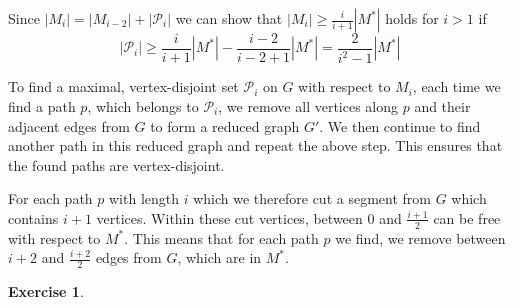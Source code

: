 \documentclass[a4paper,12pt,headsepline]{scrartcl}
\newtheorem{aufgabe}{Exercise}
\begin{document}
Since $|M_i|=|M_{i-2}|+|\mathcal P_i|$ we can show that $|M_i|\ge\frac{i}{i+1}|M^*|$ holds for $i>1$ if
\[ |\mathcal P_i|\ge\frac{i}{i+1}|M^*|-\frac{i-2}{i-2+1}|M^*|=\frac{2}{i^2-1}|M^*| \]

To find a maximal, vertex-disjoint set $\mathcal P_i$ on $G$ with respect to $M_i$, each time we find a path $p$, which belongs to $\mathcal P_i$, we remove all vertices along $p$ and their adjacent edges from $G$ to form a reduced graph $G'$.
We then continue to find another path in this reduced graph and repeat the above step.
This ensures that the found paths are vertex-disjoint.

For each path $p$ with length $i$ which we therefore cut a segment from $G$ which contains $i+1$ vertices.
Within these cut vertices, between 0 and $\frac{i+1}{2}$ can be free with respect to $M^*$.
This means that for each path $p$ we find, we remove between $i+2$ and $\frac{i+2}{2}$ edges from $G$, which are in $M^*$.

\newpage
\begin{aufgabe}
\end{aufgabe}
\end{document}
